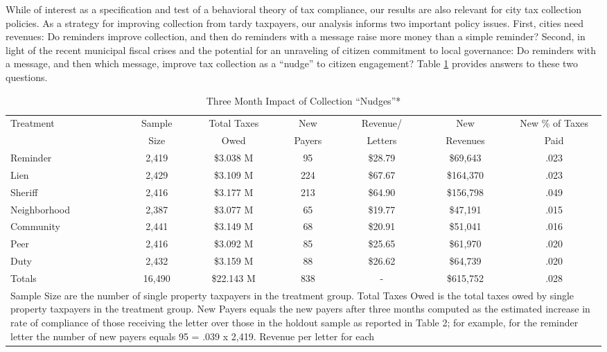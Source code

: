 \documentclass[12pt]{article}
\begin{document}
While of interest as a specification and test of a behavioral theory
of tax compliance, our results are also relevant for city tax
collection policies.  As a strategy for improving collection from
tardy taxpayers, our analysis informs two important policy issues.
First, cities need revenues: Do reminders improve collection, and then
do reminders with a message raise more money than a simple reminder?
Second, in light of the recent municipal fiscal crises and the
potential for an unraveling of citizen commitment to local governance:
Do reminders with a message, and then which message, improve tax
collection as a ``nudge'' to citizen engagement? Table \ref{sh_rev}
provides answers to these two questions.


\begin{table}[htb]
\centering
\caption{Three Month Impact of Collection ``Nudges''*} 
\label{sh_rev}
\begin{tabular}{lcccccc}
  \hline
Treatment & Sample & Total Taxes & New  & Revenue/ & New  & New \% of Taxes 
\\ 
& Size & Owed & Payers & Letters & Revenues & Paid\\
\hline
Reminder & 2,419 & \$3.038 M & 95 & \$28.79 & \$69,643 & .023\\ 
  Lien & 2,429 & \$3.109 M & 224 & \$67.67 & \$164,370 & .023 \\ 
  Sheriff & 2,416 & \$3.177 M & 213 & \$64.90 & \$156,798 & .049 \\ 
Neighborhood & 2,387 & \$3.077 M & 65 & \$19.77 & \$47,191 & .015 \\ 
  Community & 2,441 & \$3.149 M & 68 & \$20.91 & \$51,041 & .016\\ 
  Peer & 2,416 & \$3.092 M & 85 & \$25.65 & \$61,970 & .020\\ 
  Duty & 2,432 & \$3.159 M & 88 & \$26.62 & \$64,739 & .020\\ 
   \hline
   \hline
  Totals & 16,490 & \$22.143 M & 838 & - & \$615,752 & .028\\
  \hline
\multicolumn{7}{p{1\textwidth}}{\scriptsize* Sample Size are the
  number of single property taxpayers in the treatment group.  Total
  Taxes Owed is the total taxes owed by single property taxpayers in
  the treatment group. New Payers equals the new payers after three
  months computed as the estimated increase in rate of compliance of
  those receiving the letter over those in the holdout sample as
  reported in Table 2; for example, for the reminder letter the number
  of new payers equals 95 = .039 x 2,419.  Revenue per letter for each
}
\end{tabular}
\end{table}
\end{document}
